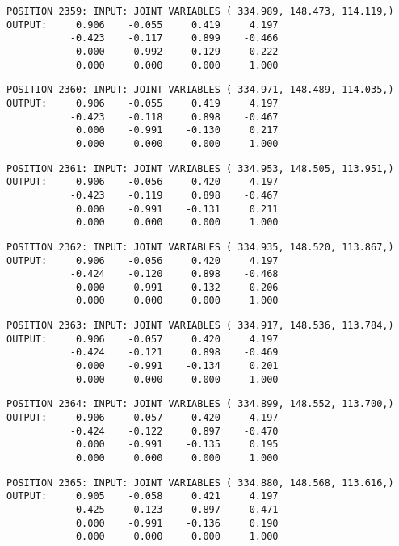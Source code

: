 \begin{verbatim}
POSITION 2359: INPUT: JOINT VARIABLES ( 334.989, 148.473, 114.119,)
OUTPUT:     0.906    -0.055     0.419     4.197
           -0.423    -0.117     0.899    -0.466
            0.000    -0.992    -0.129     0.222
            0.000     0.000     0.000     1.000
\end{verbatim} \pagebreak[1]\begin{verbatim}
POSITION 2360: INPUT: JOINT VARIABLES ( 334.971, 148.489, 114.035,)
OUTPUT:     0.906    -0.055     0.419     4.197
           -0.423    -0.118     0.898    -0.467
            0.000    -0.991    -0.130     0.217
            0.000     0.000     0.000     1.000
\end{verbatim} \pagebreak[1]\begin{verbatim}
POSITION 2361: INPUT: JOINT VARIABLES ( 334.953, 148.505, 113.951,)
OUTPUT:     0.906    -0.056     0.420     4.197
           -0.423    -0.119     0.898    -0.467
            0.000    -0.991    -0.131     0.211
            0.000     0.000     0.000     1.000
\end{verbatim} \pagebreak[1]\begin{verbatim}
POSITION 2362: INPUT: JOINT VARIABLES ( 334.935, 148.520, 113.867,)
OUTPUT:     0.906    -0.056     0.420     4.197
           -0.424    -0.120     0.898    -0.468
            0.000    -0.991    -0.132     0.206
            0.000     0.000     0.000     1.000
\end{verbatim} \pagebreak[1]\begin{verbatim}
POSITION 2363: INPUT: JOINT VARIABLES ( 334.917, 148.536, 113.784,)
OUTPUT:     0.906    -0.057     0.420     4.197
           -0.424    -0.121     0.898    -0.469
            0.000    -0.991    -0.134     0.201
            0.000     0.000     0.000     1.000
\end{verbatim} \pagebreak[1]\begin{verbatim}
POSITION 2364: INPUT: JOINT VARIABLES ( 334.899, 148.552, 113.700,)
OUTPUT:     0.906    -0.057     0.420     4.197
           -0.424    -0.122     0.897    -0.470
            0.000    -0.991    -0.135     0.195
            0.000     0.000     0.000     1.000
\end{verbatim} \pagebreak[1]\begin{verbatim}
POSITION 2365: INPUT: JOINT VARIABLES ( 334.880, 148.568, 113.616,)
OUTPUT:     0.905    -0.058     0.421     4.197
           -0.425    -0.123     0.897    -0.471
            0.000    -0.991    -0.136     0.190
            0.000     0.000     0.000     1.000
\end{verbatim} \pagebreak[1]\begin{verbatim}

\end{verbatim}
